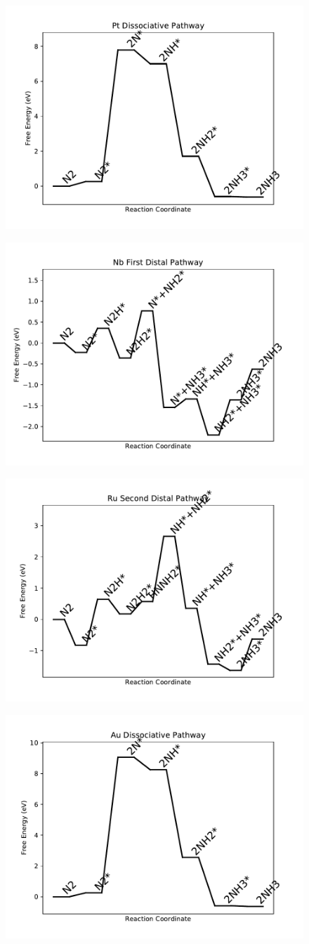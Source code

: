 \begin{figure}
\includegraphics[width=0.5\linewidth]{data/plots/Pt_dissociative.pdf}
\label{fig:Pt_dissociative}
\end{figure}

\begin{figure}
\includegraphics[width=0.5\linewidth]{data/plots/Nb_distal_1.pdf}
\label{fig:Nb_distal_1}
\end{figure}

\begin{figure}
\includegraphics[width=0.5\linewidth]{data/plots/Ru_distal_2.pdf}
\label{fig:Ru_distal_2}
\end{figure}

\begin{figure}
\includegraphics[width=0.5\linewidth]{data/plots/Au_dissociative.pdf}
\label{fig:Au_dissociative}
\end{figure}

